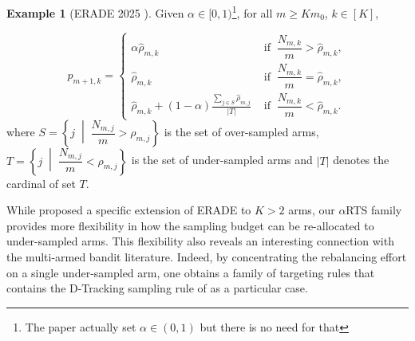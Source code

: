 \documentclass[11pt]{article}
\theoremstyle{plain}
\theoremstyle{definition}
\newtheorem{example}{Example}[section]
\begin{document}
\begin{example}[ERADE 2025 \citep{alkhnefr2025efficient}]
	Given $\alpha \in [0,1)$\footnote{The paper actually set $\alpha \in (0,1)$ but there is no need for that}, for all $m\geq Km_0$, $k \in [K]$,
	
	\[
	p_{m+1,k} =
	\begin{cases}
		\alpha \hat{\rho}_{m,k} &
		\text{ if } \ \dfrac{N_{m,k}}{m} > \hat{\rho}_{m,k}, \\[6pt]
		\hat{\rho}_{m,k} &
		\text{ if } \ \dfrac{N_{m,k}}{m} = \hat{\rho}_{m,k}, \\[6pt]
		\hat{\rho}_{m,k} + (1-\alpha)\displaystyle\frac{\sum_{j \in S}\hat{\rho}_{m,j}}{|T|} &
		\text{ if } \ \dfrac{N_{m,k}}{m} < \hat{\rho}_{m,k}.
	\end{cases}
	\]
	where $S = \left\{ j \; \middle| \; \dfrac{N_{m,j}}{m} > \rho_{m,j} \right\}$ is the set of over-sampled arms,  $T = \left\{ j \; \middle| \; \dfrac{N_{m,j}}{m} < \rho_{m,j} \right\}$ is the set of under-sampled arms and $|T|$ denotes the cardinal of set $T$.
\end{example}

\smallskip

While \citet{alkhnefr2025efficient} proposed a specific extension of ERADE to $K>2$ arms, our $\alpha$RTS family provides more flexibility in how the sampling budget can be re-allocated to under-sampled arms. This flexibility also reveals an interesting connection with the
	multi-armed bandit literature. Indeed, by concentrating the rebalancing
	effort on a single under-sampled arm, one obtains a family of targeting
	rules that contains the D-Tracking sampling rule of \cite{garivier2016optimal} as a particular case.
	
\end{document}
